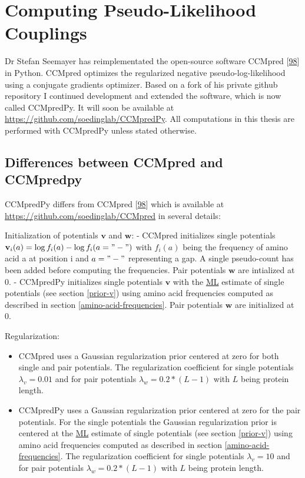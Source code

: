 \documentclass[11pt,a4paper,twoside]{book}
\providecommand{\tightlist}{%
  \setlength{\itemsep}{0pt}\setlength{\parskip}{0pt}}
\renewcommand{\v}{\mathbf{v}}
\newcommand{\w}{\mathbf{w}}
\theoremstyle{definition}
\theoremstyle{definition}
\theoremstyle{remark}
\begin{document}
\section{Computing Pseudo-Likelihood
Couplings}\label{computing-pseudo-likelihood-couplings}

Dr Stefan Seemayer has reimplementated the open-source software CCMpred
{[}\protect\hyperlink{ref-Seemayer2014}{98}{]} in Python. CCMpred
optimizes the regularized negative pseudo-log-likelihood using a
conjugate gradients optimizer. Based on a fork of his private github
repository I continued development and extended the software, which is
now called CCMpredPy. It will soon be available at
\url{https://github.com/soedinglab/CCMpredPy}. All computations in this
thesis are performed with CCMpredPy unless stated otherwise.

\subsection{Differences between CCMpred and
CCMpredpy}\label{diff-ccmpred-ccmpredpy}

CCMpredPy differs from CCMpred
{[}\protect\hyperlink{ref-Seemayer2014}{98}{]} which is available at
\url{https://github.com/soedinglab/CCMpred} in several details:

Initialization of potentials \(\v\) and \(\w\): - CCMpred initializes
single potentials \(\v_i(a) = \log f_i(a) - \log f_i(a= "-")\) with
\(f_i(a)\) being the frequency of amino acid a at position i and
\(a="-"\) representing a gap. A single pseudo-count has been added
before computing the frequencies. Pair potentials \(\w\) are intialized
at 0. - CCMpredPy initializes single potentials \(\v\) with the
\protect\hyperlink{abbrev}{ML} estimate of single potentials (see
section \ref{prior-v}) using amino acid frequencies computed as
described in section \ref{amino-acid-frequencies}. Pair potentials
\(\w\) are initialized at 0.

Regularization:

\begin{itemize}
\tightlist
\item
  CCMpred uses a Gaussian regularization prior centered at zero for both
  single and pair potentials. The regularization coefficient for single
  potentials \(\lambda_v = 0.01\) and for pair potentials
  \(\lambda_w = 0.2 * (L-1)\) with \(L\) being protein length.
\item
  CCMpredPy uses a Gaussian regularization prior centered at zero for
  the pair potentials. For the single potentials the Gaussian
  regularization prior is centered at the \protect\hyperlink{abbrev}{ML}
  estimate of single potentials (see section \ref{prior-v}) using amino
  acid frequencies computed as described in section
  \ref{amino-acid-frequencies}. The regularization coefficient for
  single potentials \(\lambda_v = 10\) and for pair potentials
  \(\lambda_w = 0.2 * (L-1)\) with \(L\) being protein length.
\end{itemize}
\end{document}
